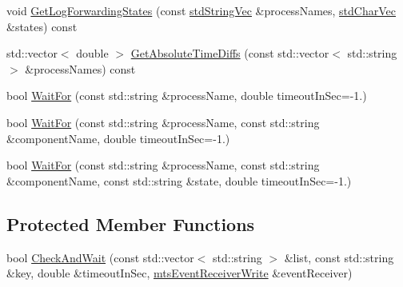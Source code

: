 \begin{DoxyCompactItemize}
\item 
void \hyperlink{classmts_manager_component_services_a30d202afee529511340ee669a4f6c272}{Get\+Log\+Forwarding\+States} (const \hyperlink{mts_generic_object_proxy_8h_ae2238149254430b4959aa4e16892fc07}{std\+String\+Vec} \&process\+Names, \hyperlink{mts_generic_object_proxy_8h_a3fcb43cabc338a5aee6772138bee2416}{std\+Char\+Vec} \&states) const 
\item 
std\+::vector$<$ double $>$ \hyperlink{classmts_manager_component_services_ae94c0e549cbbfc1aae0317c852f7bb10}{Get\+Absolute\+Time\+Diffs} (const std\+::vector$<$ std\+::string $>$ \&process\+Names) const 
\item 
bool \hyperlink{classmts_manager_component_services_abeba632d29ddc21c78749bdc45ca77f0}{Wait\+For} (const std\+::string \&process\+Name, double timeout\+In\+Sec=-\/1.)
\item 
bool \hyperlink{classmts_manager_component_services_aeab518d92e65fa518daab70b6b0b2536}{Wait\+For} (const std\+::string \&process\+Name, const std\+::string \&component\+Name, double timeout\+In\+Sec=-\/1.)
\item 
bool \hyperlink{classmts_manager_component_services_a51f220f9475f7193ad1deb4ccfded73f}{Wait\+For} (const std\+::string \&process\+Name, const std\+::string \&component\+Name, const std\+::string \&state, double timeout\+In\+Sec=-\/1.)
\end{DoxyCompactItemize}

\subsection*{Protected Member Functions}
\begin{DoxyCompactItemize}
\item 
bool \hyperlink{classmts_manager_component_services_ad614ba5609bf014f5b0f26de272ff366}{Check\+And\+Wait} (const std\+::vector$<$ std\+::string $>$ \&list, const std\+::string \&key, double \&timeout\+In\+Sec, \hyperlink{classmts_event_receiver_write}{mts\+Event\+Receiver\+Write} \&event\+Receiver)
\end{DoxyCompactItemize}
